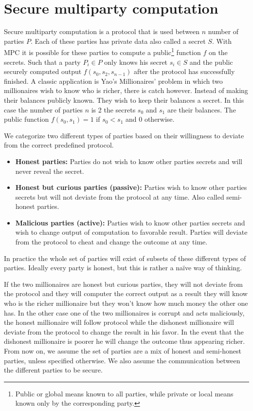 \section{Secure multiparty computation}
\label{Secure multiparty computation}
Secure multiparty computation is a protocol that is used between $n$ number of parties $P$. Each of these parties has private data also called a secret $S$. With MPC it is possible for these parties to compute a public\footnote{Public or global means known to all parties, while private or local means known only by the corresponding party.} function $f$ on the secrets. Such that a party $P_i \in P$ only knows his secret $s_i \in S$ and the public securely computed output $f(s_0,s_2,s_{n-1})$ after the protocol has successfully finished.
\newline
A classic application is Yao's Millionaires' problem \cite{yao1982protocols} in which two millionaires wish to know who is richer, there is catch however. Instead of making their balances publicly known. They wish to keep their balances a secret. In this case the number of parties $n$ is 2 the secrets $s_0$ and $s_1$ are their balances. The public function $f(s_0,s_1)=1$ if $s_0<s_1$ and $0$ otherwise.

We categorize two different types of parties based on their willingness to deviate from the correct predefined protocol.
\begin{itemize}
  \item \textbf{Honest parties:} Parties do not wish to know other parties secrets and will never reveal the secret.
  \item \textbf{Honest but curious parties (passive):} Parties wish to know other parties secrets but will not deviate from the protocol at any time. Also called semi-honest parties.
  \item \textbf{Malicious parties (active):} Parties wish to know other parties secrets and wish to change output of computation to favorable result. Parties will deviate from the protocol to cheat and change the outcome at any time.
\end{itemize}
In practice the whole set of parties will exist of subsets of these different types of parties. Ideally every party is honest, but this is rather a na\"ive way of thinking.


If the two millionaires are honest but curious parties, they will not deviate from the protocol and they will computer the correct output as a result they will know who is the richer millionaire but they won't know how much money the other one has. In the other case one of the two millionaires is corrupt and acts maliciously, the honest millionaire will follow protocol while the dishonest millionaire will deviate from the protocol to change the result in his favor. In the event that the dishonest millionaire is poorer he will change the outcome thus appearing richer.
From now on, we assume the set of parties are a mix of honest and semi-honest parties, unless specified otherwise. We also assume the communication between the different parties to be secure.

